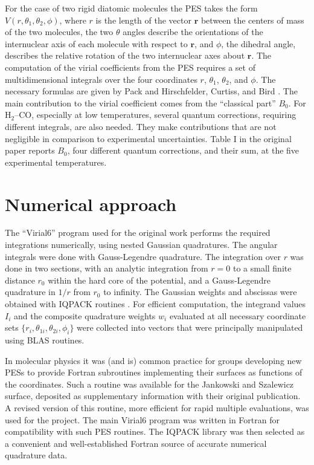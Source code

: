 For the case of two rigid diatomic molecules the PES takes the form $V(r,\theta_1, \theta_2, \phi)$, where $r$ is the length of the vector $\mathbf{r}$ between the centers of mass of the two molecules, the two $\theta$ angles describe the orientations of the internuclear axis of each molecule with respect to $\mathbf{r}$, and $\phi$, the dihedral angle, describes the relative rotation of the two internuclear axes about $\mathbf{r}$.  The computation of the virial coefficients from the PES requires a set of multidimensional integrals over the four coordinates $r$, $\theta_1$, $\theta_2$, and $\phi$.  The necessary formulas are given by Pack \cite{pack83} and Hirschfelder, Curtiss, and Bird \cite{hirs54}.  The main contribution to the virial coefficient comes from the ``classical part'' $B_0$.  For  H$_2$--CO, especially at low temperatures, several quantum corrections, requiring different integrals, are also needed.  They make contributions that are not negligible in comparison to experimental uncertainties.  Table I in the original paper reports $B_0$, four different quantum corrections, and their sum, at the five experimental temperatures.

\section{Numerical approach}
The ``Virial6'' program used for the original work performs the required integrations numerically, using nested Gaussian quadratures.  The angular integrals were done with Gauss-Legendre quadrature.  The integration over $r$ was done in two sections, with an analytic integration from $r=0$ to a small finite distance $r_0$ within the hard core of the potential, and a Gauss-Legendre quadrature in $1/r$ from $r_0$ to infinity.  The Gaussian weights and abscissas were obtained with IQPACK routines \cite{elha87}.  For efficient computation, the integrand values $I_i$ and the composite quadrature weights $w_i$ evaluated at all necessary coordinate sets $\{r_i,\theta_{1i}, \theta_{2i}, \phi_i\}$ were collected into vectors that were principally manipulated using BLAS routines.

In molecular physics it was (and is) common practice for groups developing new PESs to provide Fortran subroutines implementing their surfaces as functions of the coordinates.  Such a routine was available for the Jankowski and Szalewicz surface, deposited as supplementary information with their original publication.  A revised version of this routine, more efficient for rapid multiple evaluations, was used for the project.  The  main Virial6 program was written in Fortran for compatibility with such PES routines.  The IQPACK library was then selected as a convenient and well-established Fortran source of accurate numerical quadrature data.


